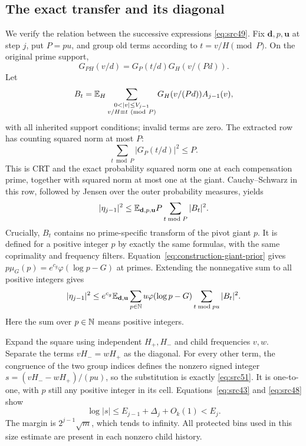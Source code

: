 \subsection{The exact transfer and its diagonal}

We verify the relation between the successive expressions
\eqref{eq:src49}.  Fix $\mathbf d,p,\mathbf u$ at step $j$, put
$P=pu$, and group old terms according to
$t=v/H\pmod P$.  On the original prime support,
\[
 G_{PH}(v/d)=G_P(t/d)G_H(v/(Pd)).
\]
Let
\[
 B_t=\E_H
       \sum_{\substack{0<|v|\le V_{j-1}\\v/H\equiv t\ ({\rm mod}\ P)}}
                G_H(v/(Pd))A_{j-1}(v),
\]
with all inherited support conditions; invalid terms are zero.
The extracted row has counting squared norm at most $P$:
\[
                   \sum_{t\bmod P}|G_P(t/d)|^2\le P.
\]
This is CRT and the exact probability squared norm one at each
compensation prime, together with squared norm at most one at the
giant.  Cauchy--Schwarz in this row, followed by Jensen over the
outer probability measures, yields
\[
                  |\eta_{j-1}|^2
                    \le\mathbb E_{\mathbf d,p,\mathbf u}
                                  P\sum_{t\bmod P}|B_t|^2.
\]
Crucially, $B_t$ contains no prime-specific transform of the pivot
giant $p$.  It is defined for a positive integer $p$ by exactly the
same formulas, with the same coprimality and frequency filters.
Equation~\eqref{eq:construction-giant-prior} gives
$p\mu_G(p)=e^{c_g}\varphi(\log p-G)$ at primes.  Extending the
nonnegative sum to all positive integers gives
\begin{equation}
 |\eta_{j-1}|^2
   \le e^{c_g}\mathbb E_{\mathbf d,\mathbf u}
          \sum_{p\in\mathbb N}u\varphi(\log p-G)
                         \sum_{t\bmod pu}|B_t|^2.
 \label{eq:src53}
\end{equation}
Here the sum over $p\in\mathbb N$ means positive integers.

Expand the square using independent $H_+,H_-$ and child frequencies
$v,w$.  Separate the terms $vH_-=wH_+$ as the diagonal.
For every other term, the congruence of the two group indices
defines the nonzero signed integer
$s=(vH_--wH_+)/(pu)$, so the substitution is exactly
\eqref{eq:src51}.  It is one-to-one, with $p$ still any positive
integer in its cell.  Equations~\eqref{eq:src43} and
\eqref{eq:src48} show
\[
 \log|s|\le E_{j-1}+\Delta_j+O_k(1)<E_j.
\]
The margin is $2^{j-1}\sqrt m$, which tends to infinity.
All protected bins used in this size estimate are present in each
nonzero child history.

